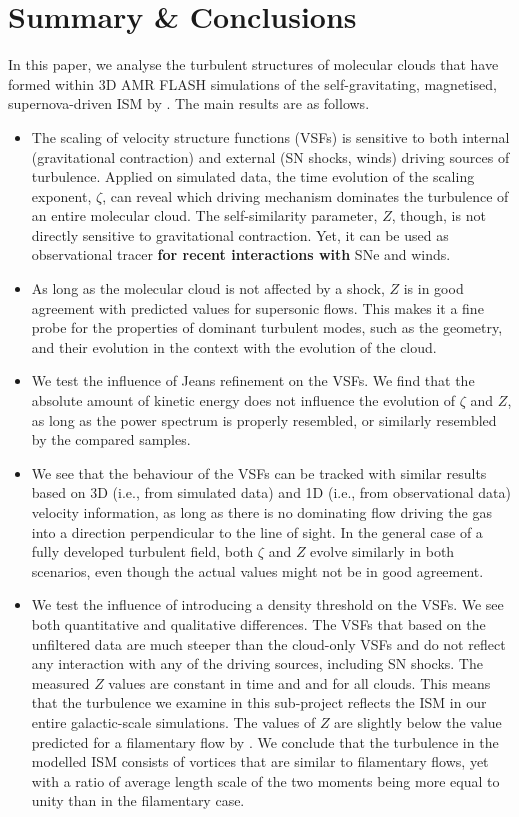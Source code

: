 \section{Summary \& Conclusions}\label{conclusions}

In this paper, we analyse the turbulent structures of molecular clouds that have formed within 3D AMR FLASH simulations of the self-gravitating, magnetised, supernova-driven ISM by \citet{IbanezMejia2016}.
The main results are as follows.

\begin{itemize}
	\item The scaling of velocity structure functions (VSFs) is sensitive to both internal (gravitational contraction) and external (SN shocks, winds) driving sources of turbulence. Applied on simulated data, the time evolution of the scaling exponent, $\zeta$, can reveal which driving mechanism dominates the turbulence of an entire molecular cloud. The self-similarity parameter, $Z$, though, is not directly sensitive to gravitational contraction. Yet, it can be used as observational tracer \textbf{for recent interactions with} SNe and winds.
	\item As long as the molecular cloud is not affected by a shock, $Z$ is in good agreement with predicted values for supersonic flows. This makes it a fine probe for the properties of dominant turbulent modes, such as the geometry, and their evolution in the context with the evolution of the cloud. 
	\item We test the influence of Jeans refinement on the VSFs. We find that the absolute amount of kinetic energy does not influence the evolution of $\zeta$ and $Z$, as long as the power spectrum is properly resembled, or similarly resembled by the compared samples.
	\item We see that the behaviour of the VSFs can be tracked with similar results based on 3D (i.e., from simulated data) and 1D (i.e., from observational data) velocity information, as long as there is no dominating flow driving the gas into a direction perpendicular to the line of sight. In the general case of a fully developed turbulent field, both $\zeta$ and $Z$ evolve similarly in both scenarios, even though the actual values might not be in good agreement.
	\item We test the influence of introducing a density threshold on the VSFs. We see both quantitative and qualitative differences. The VSFs that based on the unfiltered data are much steeper than the cloud-only VSFs and do not reflect any interaction with any of the driving sources, including SN shocks. The measured $Z$ values are constant in time and and for all clouds. This means that the turbulence we examine in this sub-project reflects the ISM in our entire galactic-scale simulations. The values of $Z$ are slightly below the value predicted for a filamentary flow by \citet{She1994}. We conclude that the turbulence in the modelled ISM consists of vortices that are similar to filamentary flows, yet with a ratio of average length scale of the two moments being more equal to unity than in the filamentary case.

\end{itemize}
